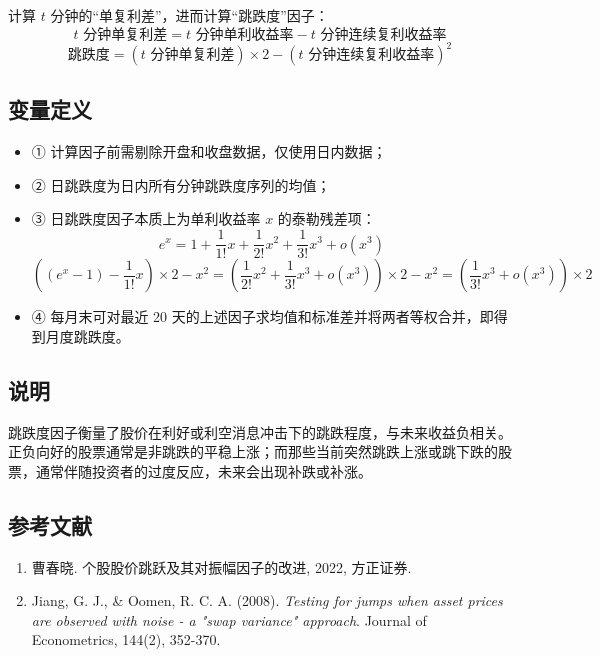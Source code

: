 \documentclass{article}
\begin{document}
计算 \( t \) 分钟的“单复利差”，进而计算“跳跌度”因子：
\begin{equation}
    t \text{ 分钟单复利差} = t \text{ 分钟单利收益率} - t \text{ 分钟连续复利收益率}
\end{equation}
\begin{equation}
    \text{跳跌度} = (t \text{ 分钟单复利差}) \times 2 - (t \text{ 分钟连续复利收益率})^2
\end{equation}

\subsection{变量定义}
\begin{itemize}
    \item ① 计算因子前需剔除开盘和收盘数据，仅使用日内数据；
    \item ② 日跳跌度为日内所有分钟跳跌度序列的均值；
    \item ③ 日跳跌度因子本质上为单利收益率 \( x \) 的泰勒残差项：
        \begin{equation*}
            e^x = 1 + \frac{1}{1!}x + \frac{1}{2!}x^2 + \frac{1}{3!}x^3 + o(x^3)
        \end{equation*}
        \begin{equation*}
            ((e^x - 1) - \frac{1}{1!}x) \times 2 - x^2 = \left(\frac{1}{2!}x^2 + \frac{1}{3!}x^3 + o(x^3)\right) \times 2 - x^2 = \left(\frac{1}{3!}x^3 + o(x^3)\right) \times 2
        \end{equation*}
    \item ④ 每月末可对最近 20 天的上述因子求均值和标准差并将两者等权合并，即得到月度跳跌度。
\end{itemize}

\subsection{说明}
跳跌度因子衡量了股价在利好或利空消息冲击下的跳跌程度，与未来收益负相关。正负向好的股票通常是非跳跌的平稳上涨；而那些当前突然跳跌上涨或跳下跌的股票，通常伴随投资者的过度反应，未来会出现补跌或补涨。

\subsection{参考文献}
\begin{enumerate}
    \item 曹春晓. 个股股价跳跃及其对振幅因子的改进, 2022, 方正证券.
    \item Jiang, G. J., \& Oomen, R. C. A. (2008). \textit{Testing for jumps when asset prices are observed with noise - a "swap variance" approach}. Journal of Econometrics, 144(2), 352-370.
\end{enumerate}
\end{document}
